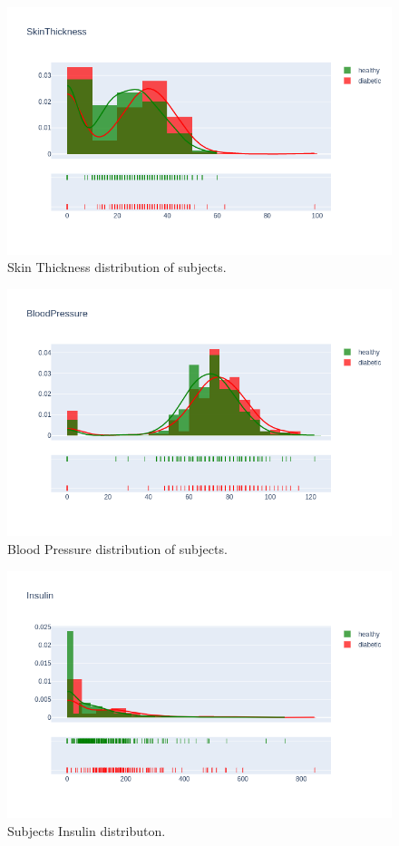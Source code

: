 \documentclass[12pt]{article}
\begin{document}
\begin{figure}[ht]
\centering
\includegraphics[width=1\textwidth]{8.png}
\caption{\label{fig:16} Skin Thickness distribution of subjects.}
\end{figure}

\begin{figure}[ht]
\centering
\includegraphics[width=1\textwidth]{9.png}
\caption{\label{fig:17} Blood Pressure distribution of subjects.}
\end{figure}

\begin{figure}[ht]
\centering
\includegraphics[width=1\textwidth]{6.png}
\caption{\label{fig:14} Subjects Insulin distributon.}
\end{figure}
\end{document}
